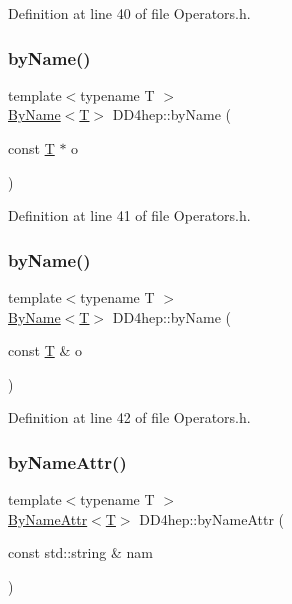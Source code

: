 Definition at line 40 of file Operators.\+h.

\hypertarget{namespace_d_d4hep_a69de365ba070cd749591f46c45a658fa}{}\label{namespace_d_d4hep_a69de365ba070cd749591f46c45a658fa} 
\subsubsection{\texorpdfstring{by\+Name()}{byName()}\hspace{0.1cm}{\footnotesize\ttfamily [2/3]}}
{\footnotesize\ttfamily template$<$typename T $>$ \\
\hyperlink{class_d_d4hep_1_1_by_name}{By\+Name}$<$\hyperlink{class_t}{T}$>$ D\+D4hep\+::by\+Name (\begin{DoxyParamCaption}\item[{const \hyperlink{class_t}{T} $\ast$}]{o }\end{DoxyParamCaption})}



Definition at line 41 of file Operators.\+h.

\hypertarget{namespace_d_d4hep_a457fc0537f18cc950ea7ced9659bbbcf}{}\label{namespace_d_d4hep_a457fc0537f18cc950ea7ced9659bbbcf} 
\subsubsection{\texorpdfstring{by\+Name()}{byName()}\hspace{0.1cm}{\footnotesize\ttfamily [3/3]}}
{\footnotesize\ttfamily template$<$typename T $>$ \\
\hyperlink{class_d_d4hep_1_1_by_name}{By\+Name}$<$\hyperlink{class_t}{T}$>$ D\+D4hep\+::by\+Name (\begin{DoxyParamCaption}\item[{const \hyperlink{class_t}{T} \&}]{o }\end{DoxyParamCaption})}



Definition at line 42 of file Operators.\+h.

\hypertarget{namespace_d_d4hep_a257f9f552919893f3f08227bf2848359}{}\label{namespace_d_d4hep_a257f9f552919893f3f08227bf2848359} 
\subsubsection{\texorpdfstring{by\+Name\+Attr()}{byNameAttr()}\hspace{0.1cm}{\footnotesize\ttfamily [1/3]}}
{\footnotesize\ttfamily template$<$typename T $>$ \\
\hyperlink{class_d_d4hep_1_1_by_name_attr}{By\+Name\+Attr}$<$\hyperlink{class_t}{T}$>$ D\+D4hep\+::by\+Name\+Attr (\begin{DoxyParamCaption}\item[{const std\+::string \&}]{nam }\end{DoxyParamCaption})}



